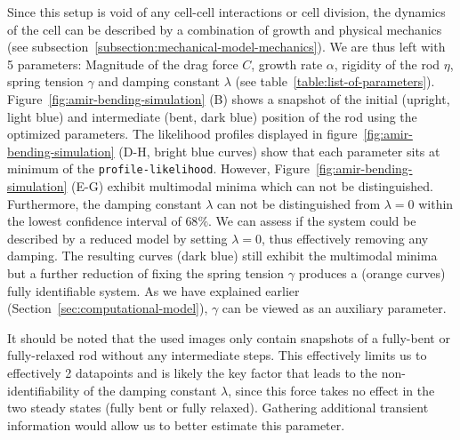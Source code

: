 Since this setup is void of any cell-cell interactions or cell division, the dynamics
of the cell
can be described by a combination of growth and physical mechanics (see
subsection~\ref{subsection:mechanical-model-mechanics}).
We are thus left with 5 parameters:
Magnitude of the drag force $C$, growth rate $\alpha$, rigidity of the rod $\eta$,
spring tension
$\gamma$ and damping constant $\lambda$ (see table~\ref{table:list-of-parameters}).
Figure~\ref{fig:amir-bending-simulation} (B) shows a snapshot of the initial
(upright, light blue)
and intermediate (bent, dark blue) position of the rod using the optimized parameters.
The likelihood profiles displayed in figure~\ref{fig:amir-bending-simulation} (D-H, bright blue
curves) show that each parameter sits at minimum of the \texttt{profile-likelihood}.
However, Figure~\ref{fig:amir-bending-simulation} (E-G) exhibit multimodal minima
which can not be
distinguished.
Furthermore, the damping constant $\lambda$ can not be distinguished from $\lambda=0$ within the
lowest confidence interval of $68\%$.
We can assess if the system could be described by a reduced model by setting $\lambda=0$, thus
effectively removing any damping.
The resulting curves (dark blue) still exhibit the multimodal minima but a further reduction of
fixing the spring tension $\gamma$ produces a (orange curves) fully identifiable system.
As we have explained earlier (Section~\ref{sec:computational-model}), $\gamma$ can be
viewed as an
auxiliary parameter.

It should be noted that the used images only contain snapshots of a fully-bent or
fully-relaxed rod
without any intermediate steps.
This effectively limits us to effectively 2 datapoints and is likely the key factor
that leads to
the non-identifiability of the damping constant $\lambda$, since this force takes no
effect in the
two steady states (fully bent or fully relaxed).
Gathering additional transient information would allow us to better estimate this parameter.

